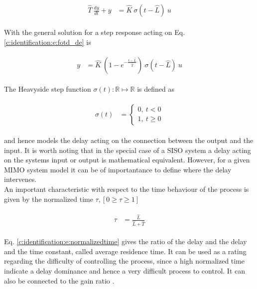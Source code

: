 \begin{align}
\begin{split}
\hat{T}~\frac{dy}{dt} + y &= \hat{K} ~\sigma(t-\hat{L})~u
\end{split}
\label{c:identification:e:fotd_de}
\end{align}

With the general solution for a step response acting on Eq.\ref{c:identification:e:fotd_de} is 

\begin{align}
\begin{split}
y &= \hat{K} ~\left( 1 - e^{-\frac{t- \hat{L}}{\hat{T}}}\right)~ \sigma(t-\hat{L}) ~u
\end{split}
\label{c:identification:e:fodt_dt}
\end{align}

The Heavyside step function $\sigma(t): \mathbb{R} \mapsto \mathbb{R}$ is defined as

\begin{align}
\begin{split}
\sigma(t) &= \begin{cases} 
      0 , ~t < 0 \\
      1, ~t \geq 0
   \end{cases}
\end{split}
\label{c:identificitaion:e:heavyside}
\end{align}

and hence models the delay acting on the connection between the output and the input. It is worth noting that in the special case of a SISO system a delay acting on the systems input or output is mathematical equivalent. However, for a given MIMO system model it can be of importantance to define where the delay intervenes. \\

An important characteristic with respect to the time behaviour of the process is given by the normalized time $\tau, \left[0 \geq \tau \geq 1 \right] $ \cite[p.16]{Astrom1995}

\begin{align}
\begin{split}
\tau &= \frac{\hat{L}}{\hat{L}+\hat{T}}
\end{split}
\label{c:identification:e:normalizedtime}
\end{align}

Eq. \ref{c:identification:e:normalizedtime} gives the ratio of the delay and the delay and the time constant, called average residence time. It can be used as a rating regarding the difficulty of controlling the process, since a high normalized time indicate a delay dominance and hence a very difficult process to control. It can also be connected to the gain ratio \cite[p.27]{Astrom2006}.\\

